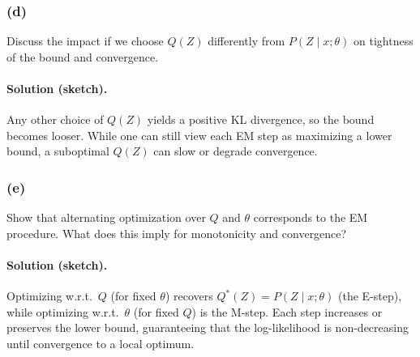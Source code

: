 \documentclass[twocolumn]{article}
\begin{document}
\begin{spacing}{1}
\subsubsection{(d)}
Discuss the impact if we choose $Q(Z)$ differently from $P(Z \mid x;\theta)$ on tightness of the bound and convergence.

\paragraph{Solution (sketch).}
Any other choice of $Q(Z)$ yields a positive KL divergence, so the bound becomes looser. While one can still view each EM step as maximizing a lower bound, a suboptimal $Q(Z)$ can slow or degrade convergence.

\subsubsection{(e)}
Show that alternating optimization over $Q$ and $\theta$ corresponds to the EM procedure. What does this imply for monotonicity and convergence?

\paragraph{Solution (sketch).}
Optimizing w.r.t.\ $Q$ (for fixed $\theta$) recovers $Q^*(Z)=P(Z\mid x;\theta)$ (the E-step), while optimizing w.r.t.\ $\theta$ (for fixed $Q$) is the M-step. Each step increases or preserves the lower bound, guaranteeing that the log-likelihood is non-decreasing until convergence to a local optimum.

\end{spacing}
\end{document}
